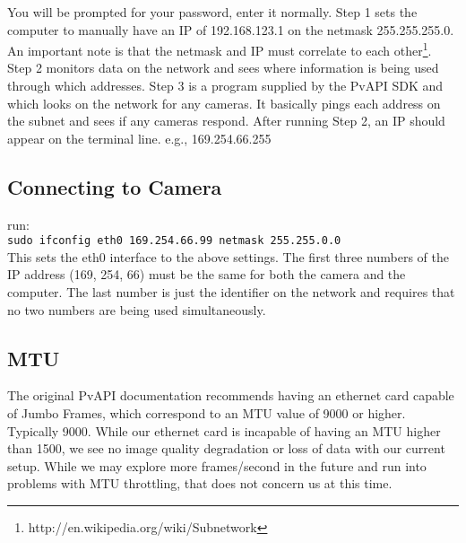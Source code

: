 \documentclass[10pt]{scrartcl}
\begin{document}
You will be prompted for your password, enter it normally. Step 1 sets the computer to manually have an IP of 192.168.123.1 on the netmask 255.255.255.0. An important note is that the netmask and IP must correlate to each other\footnote{http://en.wikipedia.org/wiki/Subnetwork}. Step 2 monitors data on the network and sees where information is being used through which addresses. Step 3 is a program supplied by the PvAPI SDK and which looks on the network for any cameras. It basically pings each address on the subnet and sees if any cameras respond. After running Step 2, an IP should appear on the terminal line. e.g., 169.254.66.255

\subsection{Connecting to Camera}\label{jcon}
run:\\
\texttt{sudo ifconfig eth0 169.254.66.99 netmask 255.255.0.0}\\

This sets the eth0 interface to the above settings. The first three numbers of the IP address (169, 254, 66) must be the same for both the camera and the computer. The last number is just the identifier on the network and requires that no two numbers are being used simultaneously. 

\subsection{MTU}
The original PvAPI documentation recommends having an ethernet card capable of Jumbo Frames, which correspond to an MTU value of 9000 or higher. Typically 9000. While our ethernet card is incapable of having an MTU higher than 1500, we see no image quality degradation or loss of data with our current setup. While we may explore more frames/second in the future and run into problems with MTU throttling, that does not concern us at this time.
\end{document}
